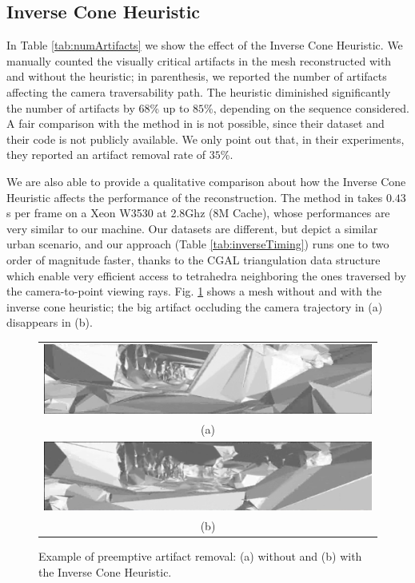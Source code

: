 \subsection{Inverse Cone Heuristic}
In Table \ref{tab:numArtifacts} we show the effect of the Inverse Cone Heuristic. We manually counted the visually critical artifacts in the mesh reconstructed with and without the heuristic; in parenthesis, we reported the number of artifacts affecting the camera traversability path. The heuristic diminished significantly the number of artifacts by $68$\% up to $85$\%, depending on the sequence considered. 
A fair comparison with the method in \cite{litvinov_Lhiuller14} is not possible, since their dataset and their code is not publicly available. We only point out that, in their experiments, they reported \cite{litvinov_Lhiuller14} an artifact removal rate of $35$\%.


We are also able to provide a qualitative comparison about how the Inverse Cone Heuristic affects the performance of the reconstruction. The method in \cite{litvinov_Lhiuller14} takes $0.43$s per frame on a Xeon W3530 at 2.8Ghz (8M Cache), whose performances are very similar to our machine.  Our datasets are different, but depict a similar urban scenario, and our approach (Table \ref{tab:inverseTiming}) runs one to two order of magnitude faster, thanks to the CGAL \cite{cgal} triangulation data structure which enable very efficient access to  tetrahedra neighboring the ones traversed by the camera-to-point viewing rays. 
Fig. \ref{fig:exampleArt} shows a mesh without and with the inverse cone heuristic; the big artifact occluding the camera trajectory in (a) disappears in (b).
 


\begin{figure}
\centering
\begin{tabular}{c}
\includegraphics[width=0.7\columnwidth]{./img//inverseConeWithout}\\
(a)\\
\includegraphics[width=0.7\columnwidth]{./img//inverseConeWith}\\
(b) 
\end{tabular}
\caption{Example of preemptive artifact removal: (a) without  and (b) with the Inverse Cone Heuristic.}
\label{fig:exampleArt}
\end{figure}

